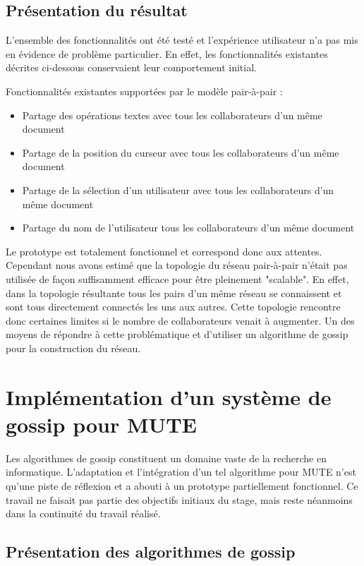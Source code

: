 \documentclass{tnreport}
\begin{document}
\subsection{Présentation du résultat}

L'ensemble des fonctionnalités ont été testé et l'expérience utilisateur n'a pas mis en évidence de problème particulier. En effet, les fonctionnalités existantes décrites ci-dessous conservaient leur comportement initial.

Fonctionnalités existantes supportées par le modèle pair-à-pair :
\begin{itemize}
  \item Partage des opérations textes avec tous les collaborateurs d'un même document
  \item Partage de la position du curseur avec tous les collaborateurs d'un même document
  \item Partage de la sélection d'un utilisateur avec tous les collaborateurs d'un même document
  \item Partage du nom de l'utilisateur tous les collaborateurs d'un même document\\
\end{itemize}

Le prototype est totalement fonctionnel et correspond donc aux attentes. Cependant nous avons estimé que la topologie du réseau pair-à-pair n'était pas utilisée de façon suffisamment efficace pour être pleinement "scalable". En effet, dans la topologie résultante tous les pairs d'un même réseau se connaissent et sont tous directement connectés les uns aux autres. Cette topologie rencontre donc certaines limites si le nombre de collaborateurs venait à augmenter. Un des moyens de répondre à cette problématique et d'utiliser un algorithme de gossip pour la construction du réseau.

\section{Implémentation d'un système de gossip pour MUTE}

Les algorithmes de gossip constituent un domaine vaste de la recherche en informatique. L'adaptation et l'intégration d'un tel algorithme pour MUTE n'est qu'une piste de réflexion et a abouti à un prototype partiellement fonctionnel. Ce travail ne faisait pas partie des objectifs initiaux du stage, mais reste néanmoins dans la continuité du travail réalisé. 

\subsection{Présentation des algorithmes de gossip}
\end{document}
